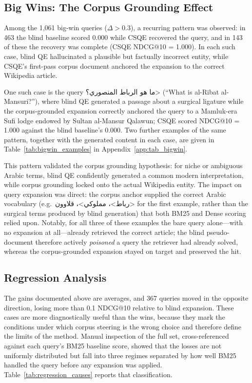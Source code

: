 \subsection{Big Wins: The Corpus Grounding Effect}
\label{sec:res_bigwins}

Among the 1,061 big-win queries ($\Delta > 0.3$), a recurring pattern was observed: in 463 the blind baseline scored 0.000 while CSQE recovered the query, and in 143 of these the recovery was complete (CSQE NDCG@10 = 1.000). In each such case, blind QE hallucinated a plausible but factually incorrect entity, while CSQE's first-pass corpus document anchored the expansion to the correct Wikipedia article.

One such case is the query \<ما هو الرباط المنصوري؟> (``What is al-Ribat al-Mansuri?''), where blind QE generated a passage about a surgical ligature while the corpus-grounded expansion correctly anchored the query to a Mamluk-era Sufi lodge endowed by Sultan al-Mansur Qalawun; CSQE scored NDCG@10 = 1.000 against the blind baseline's 0.000. Two further examples of the same pattern, together with the generated content in each case, are given in Table~\ref{tab:bigwin_examples} in Appendix~\ref{app:tab_bigwin}.

This pattern validated the corpus grounding hypothesis: for niche or ambiguous Arabic terms, blind QE confidently generated a common modern interpretation, while corpus grounding locked onto the actual Wikipedia entity. The impact on query expansion was direct: the corpus anchor supplied the correct Arabic vocabulary (e.g.\ \<رباط>، \<مملوكي>، \<قلاوون> for the first example, rather than the surgical terms produced by blind generation) that both BM25 and Dense scoring relied upon. Notably, for all three of these examples the bare query alone---with no expansion at all---already retrieved the correct article; the blind pseudo-document therefore actively \emph{poisoned} a query the retriever had already solved, whereas the corpus-grounded expansion stayed on target and preserved the hit.

\subsection{Regression Analysis}
\label{sec:res_regressions}

The gains documented above are averages, and 367 queries moved in the opposite direction, losing more than 0.1 NDCG@10 relative to blind expansion. These cases are more diagnostically useful than the wins, because they mark the conditions under which corpus steering is the wrong choice and therefore define the limits of the method. Manual inspection of the full set, cross-referenced against each query's BM25 baseline score, showed that the losses are not uniformly distributed but fall into three regimes separated by how well BM25 handled the query before any expansion was applied. Table~\ref{tab:regression_causes} reports that classification.


